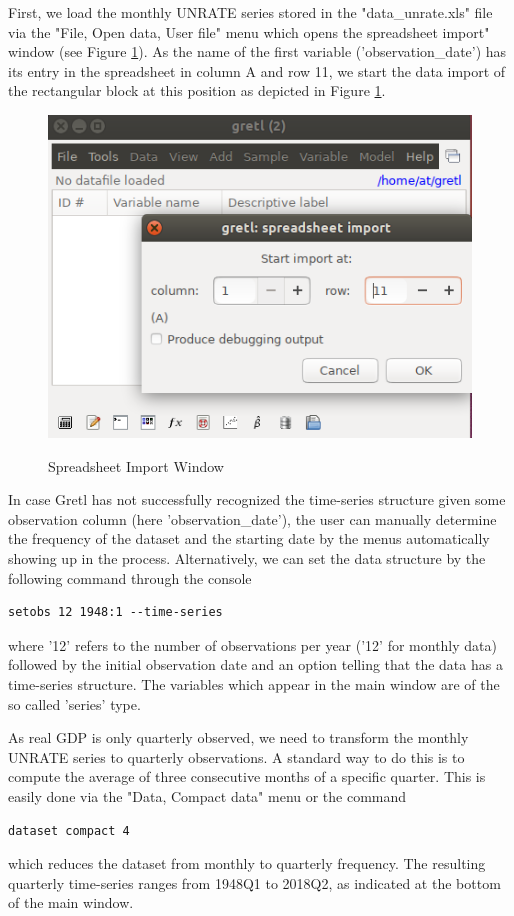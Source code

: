 \documentclass[11pt]{article}
\begin{document}
First, we load the monthly UNRATE series stored in the "data\_unrate.xls" file via the "File, Open data, User file" menu which opens the spreadsheet import" window (see Figure \ref{fig:load}). As the name of the first variable ('observation\_date') has its entry in the spreadsheet in column A and row 11, we start the data import of the rectangular block at this position as depicted in Figure \ref{fig:load}.

\begin{figure}[!h]
	\centering
	\caption{Spreadsheet Import Window}
	\includegraphics[width=.42\textwidth]{../figures/open_file}	
	\label{fig:load}
\end{figure}

In case Gretl has not successfully recognized the time-series structure given some observation column (here 'observation\_date'), the user can manually determine the frequency of the dataset and the starting date by the menus automatically showing up in the process. Alternatively, we can set the data structure by the following command through the console
\begin{verbatim}
setobs 12 1948:1 --time-series
\end{verbatim}
where '12' refers to the number of observations per year ('12' for monthly data) followed by the initial observation date and an option telling that the data has a time-series structure. The variables which appear in the main window are of the so called 'series' type.

As real GDP is only quarterly observed, we need to transform the monthly UNRATE series to quarterly observations. A standard way to do this is to compute the average of three consecutive months of a specific quarter. This is easily done via the "Data, Compact data" menu or the command
\begin{verbatim}
dataset compact 4
\end{verbatim}
which reduces the dataset from monthly to quarterly frequency. The resulting quarterly time-series ranges from 1948Q1 to 2018Q2, as indicated at the bottom of the main window.
\end{document}

